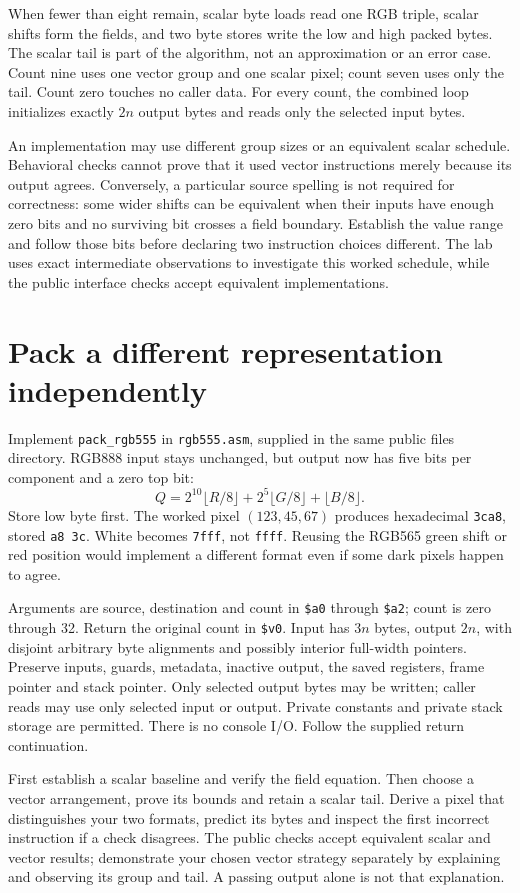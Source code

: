 When fewer than eight remain, scalar byte loads read one RGB triple, scalar
shifts form the fields, and two byte stores write the low and high packed bytes.
The scalar tail is part of the algorithm, not an approximation or an error case.
Count nine uses one vector group and one scalar pixel; count seven uses only the
tail. Count zero touches no caller data. For every count, the combined loop
initializes exactly $2n$ output bytes and reads only the selected input bytes.

An implementation may use different group sizes or an equivalent scalar schedule.
Behavioral checks cannot prove that it used vector instructions merely because
its output agrees. Conversely, a particular source spelling is not required for
correctness: some wider shifts can be equivalent when their inputs have enough
zero bits and no surviving bit crosses a field boundary. Establish the value
range and follow those bits before declaring two instruction choices different.
The lab uses exact intermediate observations to investigate this worked schedule,
while the public interface checks accept equivalent implementations.

\section{Pack a different representation independently}

Implement \texttt{pack\_rgb555} in \texttt{rgb555.asm}, supplied in the same public
files directory. RGB888 input stays unchanged, but output now has five bits per
component and a zero top bit:
\[
  Q=2^{10}\lfloor R/8\rfloor+2^5\lfloor G/8\rfloor+\lfloor B/8\rfloor.
\]
Store low byte first. The worked pixel $(123,45,67)$ produces hexadecimal
\texttt{3ca8}, stored \texttt{a8 3c}. White becomes \texttt{7fff}, not
\texttt{ffff}. Reusing the RGB565 green shift or red position would implement a
different format even if some dark pixels happen to agree.

Arguments are source, destination and count in \texttt{\$a0} through
\texttt{\$a2}; count is zero through 32. Return the original count in
\texttt{\$v0}. Input has $3n$ bytes, output $2n$, with disjoint arbitrary byte
alignments and possibly interior full-width pointers. Preserve inputs, guards,
metadata, inactive output, the saved registers, frame pointer and stack pointer.
Only selected output bytes may be written; caller reads may use only selected
input or output. Private constants and private stack storage are permitted.
There is no console I/O. Follow the supplied return continuation.

First establish a scalar baseline and verify the field equation. Then choose a
vector arrangement, prove its bounds and retain a scalar tail. Derive a pixel
that distinguishes your two formats, predict its bytes and inspect the first
incorrect instruction if a check disagrees. The public checks accept equivalent
scalar and vector results; demonstrate your chosen vector strategy separately by
explaining and observing its group and tail. A passing output alone is not that
explanation.
